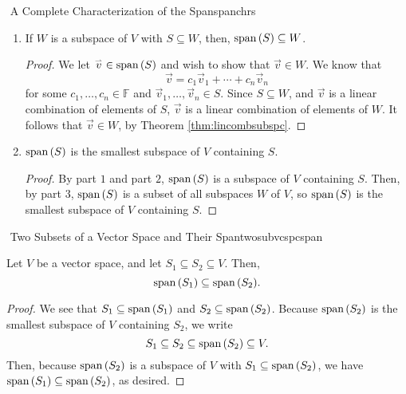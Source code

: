 \begin{theorem}{\Stop\,\,A Complete Characterization of the Span}{spanchrs}
\begin{enumerate}
\begin{proof}
                    \begin{equation*}
                        c\vec{v}=c(c_1\vec{v}_1)+\cdots+c(c_n\vec{v}_n),
                    \end{equation*}
                    which is a linear combination of the elements in \(S\), meaning that it is in \(\Span(S)\).
                \end{proof}
                \item If \(W\) is a subspace of \(V\) with \(S\subseteq W\), then, \(\text{span\,}(S)\subseteq W\).
                \begin{proof}
                    We let \(\overset{_{\rightharpoonup}}{v}\in\text{span\,}(S)\) and wish to show that \(\vec{v}\in W\). We know that
                    \begin{equation*}
                        \vec{v}=c_1\vec{v}_1+\cdots+c_n\vec{v}_n
                    \end{equation*}
                    for some \(c_1,\ldots,c_n\in\mathbb{F}\) and \(\vec{v}_1,\ldots,\vec{v}_n\in S\). Since \(S\subseteq W\), and \(\vec{v}\) is a linear combination of elements of \(S\), \(\vec{v}\) is a linear combination of elements of \(W\). It follows that \(\vec{v}\in W\), by Theorem \ref{thm:lincombsubspc}.
                \end{proof}
                \item \(\Span(S)\) is the smallest subspace of \(V\) containing \(S\). 
                \begin{proof}
                    By part \(1\) and part \(2\), \(\Span(S)\) is a subspace of \(V\) containing \(S\). Then, by part \(3\), \(\Span(S)\) is a subset of all subspaces \(W\) of \(V\), so \(\Span(S)\) is the smallest subspace of \(V\) containing \(S\).
                \end{proof}
            \end{enumerate}

        \end{theorem}
        \begin{theorem}{\Stop\,\,Two Subsets of a Vector Space and Their Span}{twosubvcspcspan}
        
            Let \(V\) be a vector space, and let \(S_1\subseteq S_2\subseteq V\). Then,
            \begin{equation*}
                \text{span\,}(S_1)\subseteq\text{span\,}(S_2).
            \end{equation*}
            \begin{proof}
                We see that \(S_1\subseteq\text{span\,}(S_1)\) and \(S_2\subseteq\text{span\,}(S_2)\). Because \(\text{span\,}(S_2)\) is the smallest subspace of \(V\) containing \(S_2\), we write
                \begin{equation*}
                    S_1\subseteq S_2\subseteq\text{span\,}(S_2)\subseteq V.
                \end{equation*}
                Then, because \(\text{span\,}(S_2)\) is a subspace of \(V\) with \(S_1\subseteq\text{span\,}(S_2)\), we have \(\text{span\,}(S_1)\subseteq\text{span\,}(S_2)\), as desired.
            \end{proof}
        \end{theorem}
